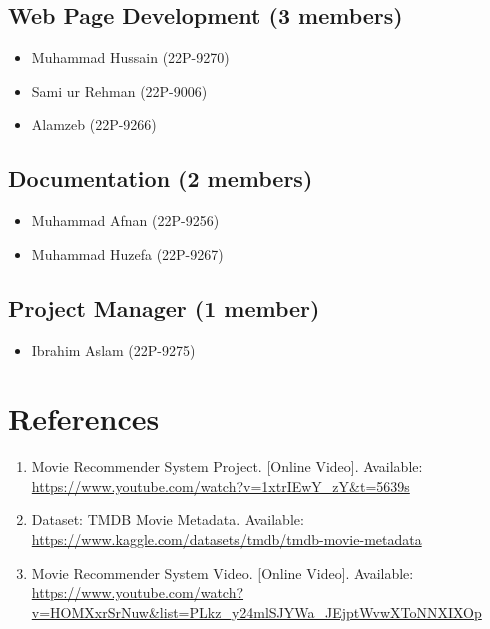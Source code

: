 \documentclass{article}
\begin{document}
\subsection{Web Page Development (3 members)}
\begin{itemize}
  \item Muhammad Hussain (22P-9270)
  \item Sami ur Rehman (22P-9006)
  \item Alamzeb (22P-9266)
\end{itemize}

\subsection{Documentation (2 members)}
\begin{itemize}
  \item Muhammad Afnan (22P-9256)
  \item Muhammad Huzefa (22P-9267)
\end{itemize}

\subsection{Project Manager (1 member)}
\begin{itemize}
  \item Ibrahim Aslam (22P-9275)
\end{itemize}

\section{References}

\begin{enumerate}
\item Movie Recommender System Project. [Online Video]. Available: \url{https://www.youtube.com/watch?v=1xtrIEwY_zY&t=5639s}
  
\item Dataset: TMDB Movie Metadata. Available: \url{https://www.kaggle.com/datasets/tmdb/tmdb-movie-metadata}
  
\item Movie Recommender System Video. [Online Video]. Available: \url{https://www.youtube.com/watch?v=HOMXxrSrNuw&list=PLkz_y24mlSJYWa_JEjptWvwXToNNXIXOp}
\end{enumerate}
\end{document}
